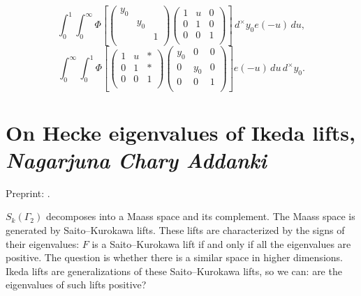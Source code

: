 \documentclass[reqno]{amsart} 
\begin{document}
\begin{equation*}
  \int_0^1 \int_0^\infty \Phi \left[
    \begin{pmatrix}
      y_0      &  &  \\
               & y_0 &  \\
               &  & 1 \\
    \end{pmatrix}
    \begin{pmatrix}
      1      & u & 0 \\
      0 & 1 & 0 \\
      0 & 0 & 1 \\
    \end{pmatrix}\right]
  \,d^\times y_0
  e(- u) \, d u,
\end{equation*}
\begin{equation*}
  \int_0^\infty \int_0^1 \Phi \left[
    \begin{pmatrix}
      1      & u & \ast \\
      0             & 1 & \ast \\
      0             & 0 & 1 \\
    \end{pmatrix}
    \begin{pmatrix}
      y_0      & 0 & 0 \\
      0 & y_0 & 0 \\
      0 & 0 & 1 \\
    \end{pmatrix}\right]
  e(- u)
  \, d u
  \,d^\times y_0.
\end{equation*}


\section{On Hecke eigenvalues of Ikeda lifts, \textnormal{\emph{Nagarjuna Chary Addanki}}}

Preprint: \cite{2024arXiv2401.08855}.

$S_k(\Gamma_2)$ decomposes into a Maass space and its complement.  The Maass space is generated by Saito--Kurokawa lifts.  These lifts are characterized by the signs of their eigenvalues: $F$ is a Saito--Kurokawa lift if and only if all the eigenvalues are positive.  The question is whether there is a similar space in higher dimensions.  Ikeda lifts are generalizations of these Saito--Kurokawa lifts, so we can: are the eigenvalues of such lifts positive?
\end{document}
